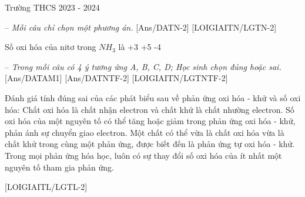 \def\x{110}
\setcounter{bt}{0}
\setcounter{ex}{0}
\setcounter{tieumuc}{0}
\begin{tcolorbox}
	\begin{name}{Trường THCS }{2023 - 2024}
	\end{name}
\end{tcolorbox}
-- \textit{Mỗi câu chỉ chọn một phương án.}
[Ans/DATN-2]
\luuloigiaiex
{}[LOIGIAITN/LGTN-2]
\begin{ex}Số oxi hóa của nitơ trong $NH_{3}$ là
	\choice
	{+3}
	{+5}
	{-4}
	{}
\end{ex}


-- \textit{Trong mỗi câu có 4 ý tương ứng A, B, C, D; Học sinh chọn đúng hoặc sai.}
[Ans/DATAM1]
[Ans/DATNTF-2]
\luulgEXTF
{}[LOIGIAITN/LGTNTF-2]
\begin{ex} Đánh giá tính đúng sai của các phát biểu sau về phản ứng oxi hóa - khử và số oxi hóa:
	\choiceTF
	{\True Chất oxi hóa là chất nhận electron và chất khử là chất nhường electron.}
	{\True Số oxi hóa của một nguyên tố có thể tăng hoặc giảm trong phản ứng oxi hóa - khử, phản ánh sự chuyển giao electron.}
	{\True Một chất có thể vừa là chất oxi hóa vừa là chất khử trong cùng một phản ứng, được biết đến là phản ứng tự oxi hóa - khử.}
	{Trong mọi phản ứng hóa học, luôn có sự thay đổi số oxi hóa của ít nhất một nguyên tố tham gia phản ứng.}
	\loigiai{}
\end{ex}

[LOIGIAITL/LGTL-2]
\luuloigiaibt


\label{\x}
